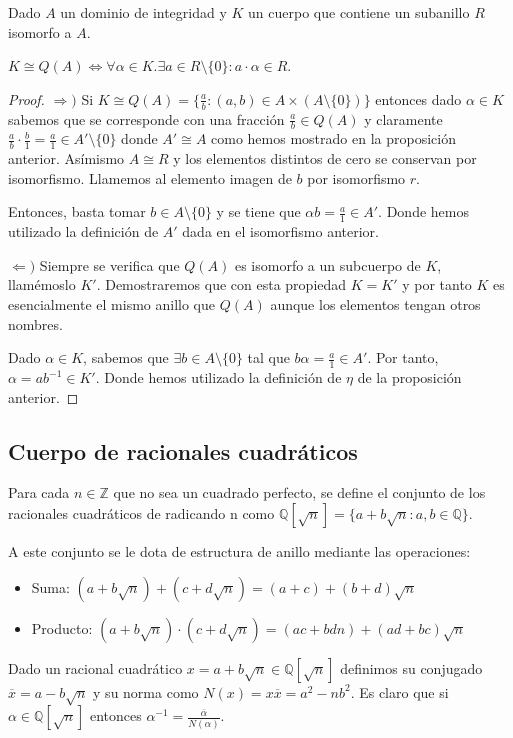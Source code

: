\begin{proposition}
Dado $A$ un dominio de integridad y $K$ un cuerpo que contiene un subanillo $R$ isomorfo a $A$.

$K \cong Q(A) \iff \forall \alpha \in K. \exists a \in R \setminus \{0\}:a \cdot \alpha \in R$. 
\end{proposition}
\begin{proof}
$\Rightarrow)$ Si $K \cong Q(A) = \{\frac{a}{b}:(a,b) \in A \times (A \setminus \{0\})\}$ entonces dado $\alpha \in K$ sabemos que se corresponde con una fracción $\frac{a}{b} \in Q(A)$ y claramente $\frac{a}{b} \cdot \frac{b}{1} = \frac{a}{1} \in A' \setminus \{0\}$ donde $A' \cong A$ como hemos mostrado en la proposición anterior. Asímismo $A \cong R$ y los elementos distintos de cero se conservan por isomorfismo. Llamemos al elemento imagen de $b$ por isomorfismo $r$. 

Entonces, basta tomar $b \in A \setminus \{0\}$ y se tiene que $\alpha b = \frac{a}{1} \in A'$. Donde hemos utilizado la definición de $A'$ dada en el isomorfismo anterior.  

$\Leftarrow)$ Siempre se verifica que $Q(A)$ es isomorfo a un subcuerpo de $K$, llamémoslo $K'$. Demostraremos que con esta propiedad $K = K'$ y por tanto $K$ es esencialmente el mismo anillo que $Q(A)$ aunque los elementos tengan otros nombres. 

Dado $\alpha \in K$, sabemos que $\exists b \in A \setminus \{0\}$ tal que $b \alpha = \frac{a}{1} \in A'$. Por tanto, $\alpha = ab^{-1} \in K'$. Donde hemos utilizado la definición de $\eta$ de la proposición anterior. 
\end{proof}

\subsection{Cuerpo de racionales cuadráticos}

\begin{definition}
Para cada $n \in \mathbb{Z}$ que no sea un cuadrado perfecto, se define el conjunto de los racionales cuadráticos de radicando n como $\mathbb{Q}[\sqrt{n}] = \{a+b\sqrt{n}:a,b \in \mathbb{Q}\}$.

A este conjunto se le dota de estructura de anillo mediante las operaciones:

\begin{itemize}
\item Suma: $(a+b\sqrt{n})+(c+d\sqrt{n}) = (a+c) + (b+d)\sqrt{n}$
\item Producto: $(a+b\sqrt{n}) \cdot (c+d\sqrt{n}) = (ac+bdn)+(ad+bc)\sqrt{n}$
\end{itemize}

Dado un racional cuadrático $x = a + b \sqrt{n} \in \mathbb{Q}[\sqrt{n}]$ definimos su conjugado $\overline{x} = a - b \sqrt{n}$ y su norma como $N(x) = x \overline{x} = a^2-nb^2$. Es claro que si $\alpha \in \mathbb{Q}[\sqrt{n}]$ entonces $\alpha^{-1} = \frac{\overline{\alpha}}{N(\alpha)}$.
\end{definition}

